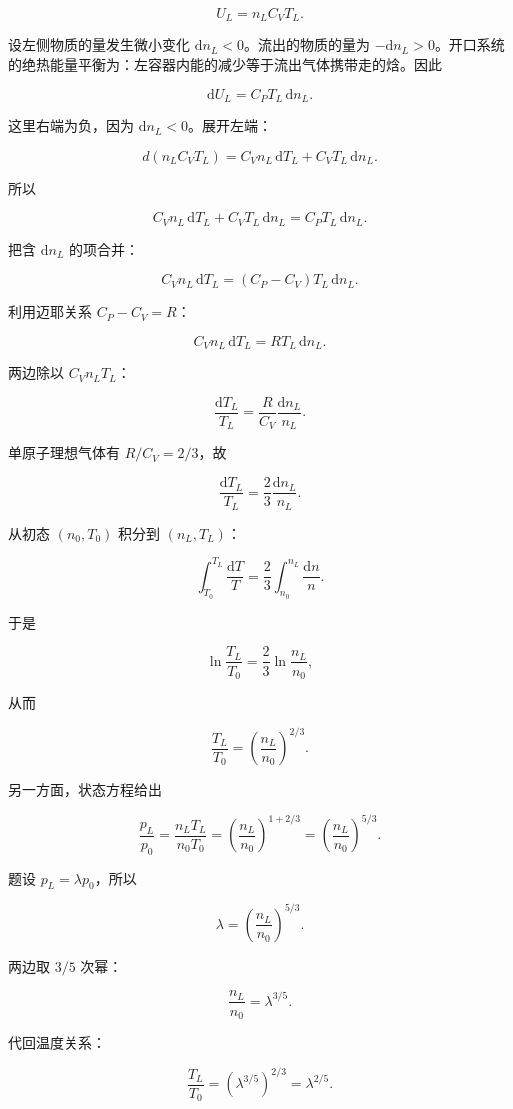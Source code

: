 \documentclass[12pt,a4paper,UTF8]{ctexart}
\begin{document}
\[U_L=n_LC_VT_L.\]

设左侧物质的量发生微小变化 \(\mathrm{d}n_L<0\)。流出的物质的量为
\(-\mathrm{d}n_L>0\)。开口系统的绝热能量平衡为：左容器内能的减少等于流出气体携带走的焓。因此

\[
\mathrm{d}U_L=C_PT_L\,\mathrm{d}n_L.
\]

这里右端为负，因为 \(\mathrm{d}n_L<0\)。展开左端：

\[
d(n_LC_VT_L)
=C_Vn_L\,\mathrm{d}T_L+C_VT_L\,\mathrm{d}n_L.
\]

所以

\[
C_Vn_L\,\mathrm{d}T_L+C_VT_L\,\mathrm{d}n_L
=C_PT_L\,\mathrm{d}n_L.
\]

把含 \(\mathrm{d}n_L\) 的项合并：

\[
C_Vn_L\,\mathrm{d}T_L
=(C_P-C_V)T_L\,\mathrm{d}n_L.
\]

利用迈耶关系 \(C_P-C_V=R\)：

\[
C_Vn_L\,\mathrm{d}T_L=RT_L\,\mathrm{d}n_L.
\]

两边除以 \(C_Vn_LT_L\)：

\[
\frac{\mathrm{d}T_L}{T_L}
=\frac{R}{C_V}\frac{\mathrm{d}n_L}{n_L}.
\]

单原子理想气体有 \(R/C_V=2/3\)，故

\[
\frac{\mathrm{d}T_L}{T_L}=\frac23\frac{\mathrm{d}n_L}{n_L}.
\]

从初态 \((n_0,T_0)\) 积分到 \((n_L,T_L)\)：

\[
\int_{T_0}^{T_L}\frac{\mathrm{d}T}{T}
=\frac23\int_{n_0}^{n_L}\frac{\mathrm{d}n}{n}.
\]

于是

\[
\ln\frac{T_L}{T_0}
=\frac23\ln\frac{n_L}{n_0},
\]

从而

\[
\frac{T_L}{T_0}
=\left(\frac{n_L}{n_0}\right)^{2/3}.
\]

另一方面，状态方程给出

\[
\frac{p_L}{p_0}
=\frac{n_LT_L}{n_0T_0}
=\left(\frac{n_L}{n_0}\right)^{1+2/3}
=\left(\frac{n_L}{n_0}\right)^{5/3}.
\]

题设 \(p_L=\lambda p_0\)，所以

\[
\lambda=\left(\frac{n_L}{n_0}\right)^{5/3}.
\]

两边取 \(3/5\) 次幂：

\[
\boxed{\frac{n_L}{n_0}=\lambda^{3/5}}.
\]

代回温度关系：

\[
\frac{T_L}{T_0}
=\left(\lambda^{3/5}\right)^{2/3}
=\lambda^{2/5}.
\]
\end{document}
